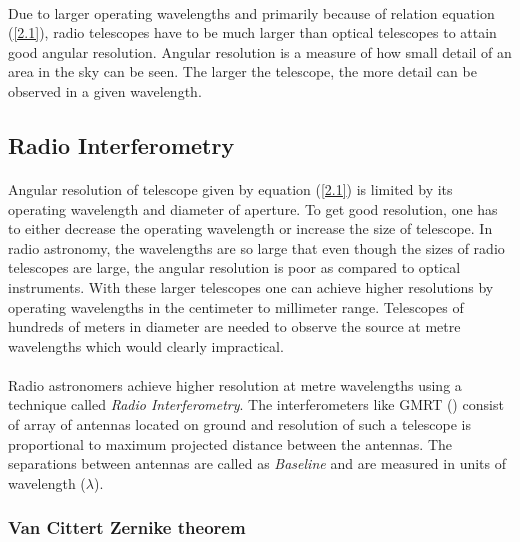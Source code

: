 \paragraph{}Due to larger operating wavelengths and primarily because of relation equation (\ref{2.1}), 
radio telescopes have to be much larger than optical telescopes to attain good angular resolution. Angular resolution 
is a measure of how small detail of an area in the sky can be seen. The larger the telescope, the more 
detail can be observed in a given wavelength.

\subsection{Radio Interferometry}
\label{s:radio_interferometry}

\paragraph{}Angular resolution of telescope given by equation (\ref{2.1}) is limited by its operating wavelength and 
diameter of aperture. To get good resolution, one has to either decrease the operating wavelength or 
increase the size of telescope. In radio astronomy, the wavelengths are so large that even though the 
sizes of radio telescopes are large, the angular resolution is poor as compared to optical instruments.
With these larger telescopes one can achieve higher resolutions by operating wavelengths in the
centimeter to millimeter range. Telescopes of hundreds of meters in diameter are needed to observe the source 
at metre wavelengths which would clearly impractical.

\paragraph{}Radio astronomers achieve higher resolution at metre wavelengths using a technique called 
\emph{Radio Interferometry}. The interferometers like GMRT (\cite{gmrt}) consist of array of antennas 
located on ground and resolution of such a telescope is proportional to maximum projected distance 
between the antennas. The separations between antennas are called as \emph{Baseline} and are measured in units of wavelength
($\lambda$). 

\subsubsection{Van Cittert \textendash Zernike theorem}

